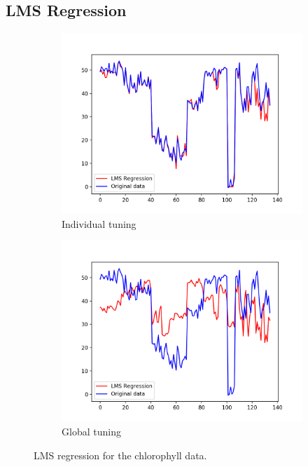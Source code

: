 \documentclass[12pt, a4paper]{article}
\begin{document}
\subsection{LMS Regression}
\begin{figure}[H]
    \centering
    \begin{subfigure}{0.45\textwidth}
        \includegraphics[width=\textwidth]{recursos/2/lms_regression_individual_tune}
        \caption{ Individual tuning}
    \end{subfigure}
    \begin{subfigure}{0.45\textwidth}
        \includegraphics[width=\textwidth]{recursos/2/lms_regression_global_tune}
        \caption{ Global tuning}
    \end{subfigure}
     \caption{LMS regression for the chlorophyll data.}
\end{figure}
\end{document}
